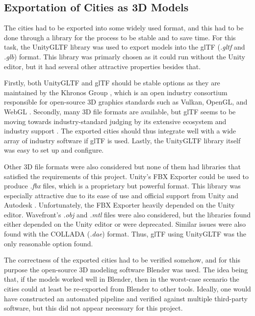 \subsection{Exportation of Cities as 3D Models}

The cities had to be exported into some widely used format, and this had to be done through a library for the process to be stable and to save time.
For this task, the UnityGLTF \cite{unity_gltf} library was used to export models into the glTF (\textit{.gltf} and \textit{.glb}) \cite{gltf} format.
This library was primarly chosen as it could run without the Unity editor, but it had several other attractive properties besides that.

Firstly, both UnityGLTF and glTF should be stable options as they are maintained by the Khronos Group \cite{unity_gltf} \cite{gltf}, which is an open industry consortium responsible for open-source 3D graphics standards such as Vulkan, OpenGL, and WebGL \cite{khronos_about}.
Secondly, many 3D file formats are available, but glTF seems to be moving towards industry-standard judging by its extensive ecosystem and industry support \cite{gltf}.
The exported cities should thus integrate well with a wide array of industry software if glTF is used.
Lastly, the UnityGLTF library itself was easy to set up and configure.

Other 3D file formats were also considered but none of them had libraries that satisfied the requirements of this project.
Unity's FBX Exporter \cite{fbxexporter} could be used to produce \textit{.fbx} \cite{fbx} files, which is a proprietary but powerful format.
This library was especially attractive due to its ease of use and official support from Unity and Autodesk \cite{fbxexporter}.
Unfortunately, the FBX Exporter heavily depended on the Unity editor.
Wavefront's \textit{.obj} \cite{obj_files} and \textit{.mtl} \cite{mtl_files} files were also considered, but the libraries found either depended on the Unity editor or were deprecated.
Similar issues were also found with the COLLADA (\textit{.dae}) \cite{collada_files} format.
Thus, glTF using UnityGLTF was the only reasonable option found.

The correctness of the exported cities had to be verified somehow, and for this purpose the open-source 3D modeling software Blender \cite{blender} was used. 
The idea being that, if the models worked well in Blender, then in the worst-case scenario the cities could at least be re-exported from Blender to other tools.
Ideally, one would have constructed an automated pipeline and verified against multiple third-party software, but this did not appear necessary for this project.